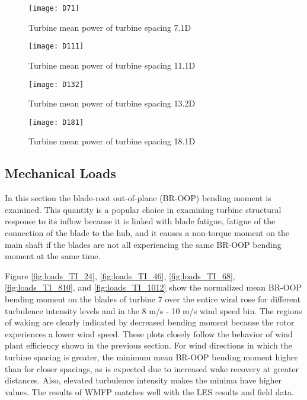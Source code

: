 \documentclass{umthesis}
\begin{document}
\begin{figure}
  \centering
  \texttt{[image: D71]}
  \caption{Turbine mean power of turbine spacing 7.1D}\label{fig:D71}
\end{figure}

\begin{figure}
  \centering
  \texttt{[image: D111]}
  \caption{Turbine mean power of turbine spacing 11.1D}\label{fig:D111}
\end{figure}

\begin{figure}
  \centering
  \texttt{[image: D132]}
  \caption{Turbine mean power of turbine spacing 13.2D}\label{fig:D132}
\end{figure}

\begin{figure}
  \centering
  \texttt{[image: D181]}
  \caption{Turbine mean power of turbine spacing 18.1D}\label{fig:D181}
\end{figure}


\subsection{Mechanical Loads}
In this section the blade-root out-of-plane (BR-OOP) bending moment is examined. This quantity is a popular choice in examining turbine structural response to its inflow because it is linked with blade fatigue, fatigue of the connection of the blade to the hub, and it causes a non-torque moment on the main shaft if the blades are not all experiencing the same BR-OOP bending moment at the same time.

Figure \ref{fig:loads_TI_24}, \ref{fig:loads_TI_46}, \ref{fig:loads_TI_68}, \ref{fig:loads_TI_810}, and \ref{fig:loads_TI_1012} show the normalized mean BR-OOP bending moment on the blades of turbine 7 over the entire wind rose for different turbulence intensity levels and in the 8 m/s - 10 m/s wind speed bin. The regions of waking are clearly indicated by decreased bending moment because the rotor experiences a lower wind speed. These plots closely follow the behavior of wind plant efficiency shown in the previous section. For wind directions in which the turbine spacing is greater, the minimum mean BR-OOP bending moment higher than for closer spacings, as is expected due to increased wake recovery at greater distances. Also, elevated turbulence intensity makes the minima have higher values. The results of WMFP matches well with the LES results and field data.
\end{document}
